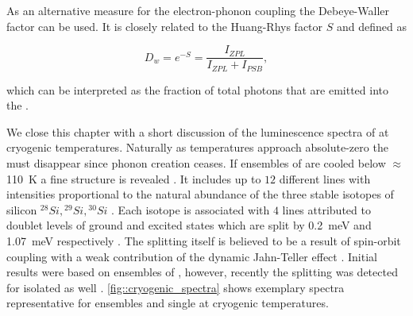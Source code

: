    As an alternative measure for the electron-phonon coupling the Debeye-Waller factor can be used. It is closely related to the Huang-Rhys factor $S$ and defined as

   \begin{equation}
     D_w = e^{-S} = \frac{I_{ZPL}}{I_{ZPL} + I_{PSB}},
   \end{equation}

    which can be interpreted as the fraction of total photons that are emitted into the \zpl.

    We close this chapter with a short discussion of the luminescence spectra of \sivs at cryogenic temperatures. Naturally as temperatures approach absolute-zero the \psb must disappear since phonon creation ceases. If ensembles of \sivs are cooled below $\approx$ \SI{110}{\kelvin} a fine structure is revealed \cite{neu2013low}. It includes up to $12$ different lines with intensities proportional to the natural abundance of the three stable isotopes of silicon ${}^{28}Si, {}^{29}Si, {}^{30}Si$ \cite{Clark1995}. Each isotope is associated with $4$ lines attributed to doublet levels of ground and excited states which are split by \SI{0.2}{\milli\eV} and \SI{1.07}{\milli\eV} respectively \cite{Rogers2014, Hepp2014, Clark1995}. The splitting itself is believed to be a result of spin-orbit coupling with a weak contribution of the dynamic Jahn-Teller effect \cite{Hepp2014}. Initial results were based on ensembles of \sivs, however, recently the splitting was detected for isolated \sivs as well \cite{Dietrich2014a}. \autoref{fig::cryogenic_spectra} shows exemplary spectra representative for ensembles and single \siv at cryogenic temperatures.

